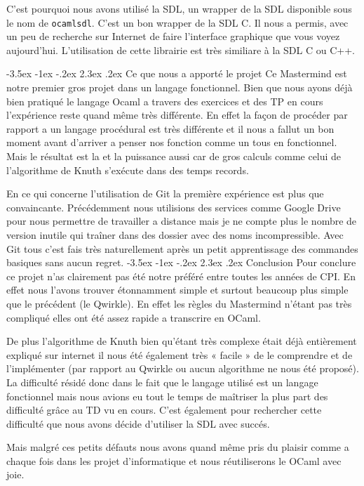 \documentclass[11pt, a4paper]{article}
\makeatletter
\renewcommand{\section}{\@startsection{section}{1}{\z@}%
          {-3.5ex \@plus -1ex \@minus -.2ex}%
          {2.3ex \@plus .2ex}%
          {\reset@font\Large\bfseries	}}
\makeatother
\begin{document}
\vspace{3  mm}

C'est pourquoi nous avons utilisé la SDL, un wrapper de la SDL disponible sous le nom de \texttt{ocamlsdl}. C'est un bon wrapper de la SDL C.
Il nous a permis, avec un peu de recherche sur Internet de faire l'interface graphique que vous voyez aujourd'hui. 
L'utilisation de cette librairie est très similiare à la SDL C ou C++.

\section{Ce que nous a apporté le projet} 
Ce Mastermind est notre premier gros projet dans un langage fonctionnel. Bien que nous ayons déjà bien pratiqué le langage Ocaml a travers des exercices et des 
TP en cours l’expérience reste quand même très différente. En effet la façon de procéder par rapport a un langage procédural est très différente et il nous a fallut 
un bon moment avant d’arriver a penser nos fonction comme un tous en fonctionnel. Mais le résultat est la et la puissance aussi car de gros calculs comme celui de
 l’algorithme de Knuth s’exécute dans des temps records.

\vspace{3  mm}

En ce qui concerne l’utilisation de Git la première expérience est plus que convaincante. Précédemment nous utilisions des services
 comme Google Drive pour nous permettre de travailler a distance mais je ne compte plus le nombre de version inutile qui traîner dans des
  dossier avec des noms incompressible. Avec Git tous c’est fais très naturellement après un petit apprentissage des commandes basiques sans aucun regret. 
\newpage
\section{Conclusion} 
Pour conclure ce projet n’as clairement pas été notre préféré entre toutes les années de CPI. En effet nous l’avons trouver étonnamment 
simple et surtout beaucoup plus simple que le précédent (le Qwirkle). En effet les règles du Mastermind n’étant pas très compliqué elles ont été assez rapide a transcrire en OCaml.

\vspace{3  mm}

De plus l’algorithme de Knuth bien qu’étant très complexe était déjà entièrement expliqué sur internet il nous été également très « facile » de le comprendre
 et de l’implémenter (par rapport au Qwirkle ou aucun algorithme ne nous été proposé). La difficulté résidé donc dans le fait que le langage utilisé est un 
 langage fonctionnel mais nous avions eu tout le temps de maîtriser la plus part des difficulté grâce au TD vu en cours. C’est également pour rechercher cette
  difficulté que nous avons décide d’utiliser la SDL avec succés.

\vspace{3  mm}

Mais malgré ces petits défauts nous avons quand même pris du plaisir comme a chaque fois dans les projet d’informatique et nous réutiliserons le OCaml avec joie.
\end{document}
